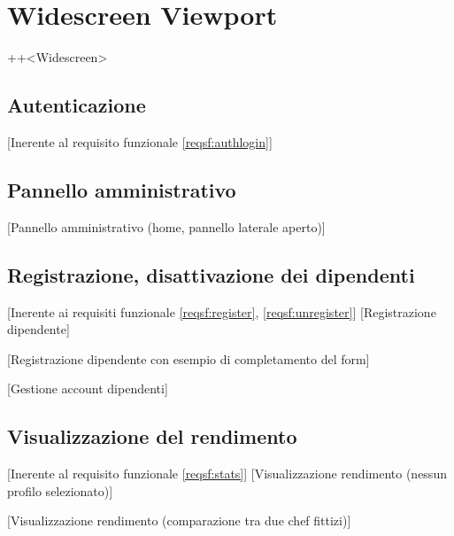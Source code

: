 \section*{Widescreen Viewport}+\Materialpanoramahorizontal+<Widescreen>

\subsection{Autenticazione}[Inerente al requisito funzionale \ref{reqsf:authlogin}]

\subsection{Pannello amministrativo}

	[Pannello amministrativo (home, pannello laterale aperto)]

\subsection{Registrazione, disattivazione dei dipendenti}[Inerente ai requisiti funzionale \ref{reqsf:register}, \ref{reqsf:unregister}]
	[Registrazione dipendente]

	[Registrazione dipendente con esempio di completamento del form]

	[Gestione account dipendenti]

\subsection{Visualizzazione del rendimento}[Inerente al requisito funzionale \ref{reqsf:stats}]
	[Visualizzazione rendimento (nessun profilo selezionato)]

	[Visualizzazione rendimento (comparazione tra due chef fittizi)]

